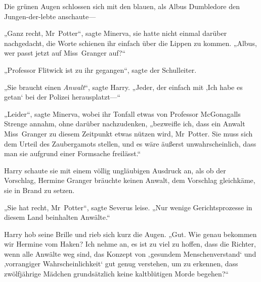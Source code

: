 Die grünen Augen schlossen sich mit den blauen, als Albus Dumbledore den Jungen-der-lebte anschaute—

„Ganz recht, Mr~Potter“, sagte Minerva, sie hatte nicht einmal darüber nachgedacht, die Worte schienen ihr einfach über die Lippen zu kommen. „Albus, wer passt jetzt auf Miss~Granger auf?“

„Professor Flitwick ist zu ihr gegangen“, sagte der Schulleiter.

„Sie braucht einen \emph{Anwalt}“, sagte Harry. „Jeder, der einfach mit ‚Ich habe es getan‘ bei der Polizei herausplatzt—“

„Leider“, sagte Minerva, wobei ihr Tonfall etwas von Professor McGonagalls Strenge annahm, ohne darüber nachzudenken, „bezweifle ich, dass ein Anwalt Miss~Granger zu diesem Zeitpunkt etwas nützen wird, Mr~Potter. Sie muss sich dem Urteil des Zaubergamots stellen, und es wäre äußerst unwahrscheinlich, dass man sie aufgrund einer Formsache freilässt.“

Harry schaute sie mit einem völlig ungläubigen Ausdruck an, als ob der Vorschlag, Hermine Granger bräuchte keinen Anwalt, dem Vorschlag gleichkäme, sie in Brand zu setzen.

„Sie hat recht, Mr~Potter“, sagte Severus leise. „Nur wenige Gerichtsprozesse in diesem Land beinhalten Anwälte.“

Harry hob seine Brille und rieb sich kurz die Augen.
„Gut. Wie genau bekommen wir Hermine vom Haken? Ich nehme an, es ist zu viel zu hoffen, dass die Richter, wenn alle Anwälte weg sind, das Konzept von ‚gesundem Menschenverstand‘ und ‚vorrangiger Wahrscheinlichkeit‘ gut genug verstehen, um zu erkennen, dass zwölfjährige Mädchen grundsätzlich keine kaltblütigen Morde begehen?“

